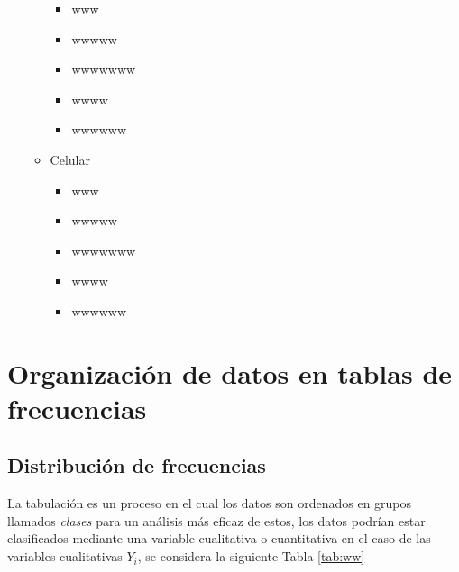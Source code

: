 \documentclass[
  10pt,
]{krantz}
\providecommand{\tightlist}{%
  \setlength{\itemsep}{0pt}\setlength{\parskip}{0pt}}
\theoremstyle{definition}
\theoremstyle{definition}
\theoremstyle{definition}
\theoremstyle{definition}
\theoremstyle{remark}
\begin{document}
\begin{enumerate}
\begin{itemize}
    \begin{itemize}
    \tightlist
    \item
      www
    \item
      wwwww
    \item
      wwwwwww
    \item
      wwww
    \item
      wwwwww
    \end{itemize}
  \item
    Celular

    \begin{itemize}
    \tightlist
    \item
      www
    \item
      wwwww
    \item
      wwwwwww
    \item
      wwww
    \item
      wwwwww
    \end{itemize}
  \end{itemize}
\end{enumerate}

\hypertarget{organizaciuxf3n-de-datos-en-tablas-de-frecuencias}{%
\chapter{Organización de datos en tablas de frecuencias}\label{organizaciuxf3n-de-datos-en-tablas-de-frecuencias}}

\hypertarget{distribuciuxf3n-de-frecuencias}{%
\section{Distribución de frecuencias}\label{distribuciuxf3n-de-frecuencias}}

La tabulación es un proceso en el cual los datos son ordenados en grupos llamados \emph{clases} para un análisis más eficaz de estos, los datos podrían estar clasificados mediante una variable cualitativa o cuantitativa en el caso de las variables cualitativas \(Y_i\), se considera la siguiente Tabla \ref{tab:ww}
\end{document}
